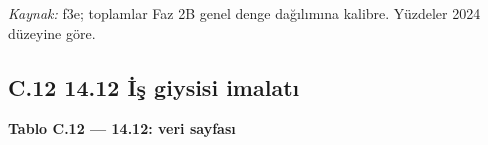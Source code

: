 \endgroup

\emph{Kaynak:} \etiketT{} f3e; toplamlar Faz 2B genel denge dağılımına kalibre. Yüzdeler 2024 düzeyine göre.

\hypertarget{nace_kartlar_13-15-c12-1412-iux307ux15f-giysisi-imalatux131}{%
\subsection{C.12 14.12 İş giysisi imalatı}\label{nace_kartlar_13-15-c12-1412-iux307ux15f-giysisi-imalatux131}}


\textbf{Tablo C.12 --- 14.12: veri sayfası}

\nopagebreak[4]

\begingroup\gbtablo\small

